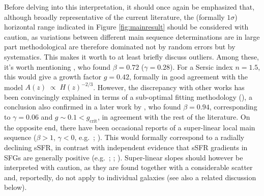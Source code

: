 \documentclass[fleqn,usenatbib]{mnras}
\begin{document}
Before delving into this interpretation, it should once again be emphasized that, although broadly representative of the current literature, the (formally $1 \sigma$) horizontal range indicated in Figure \ref{fig:mainresult} should be considered with caution, as variations between different main sequence determinations are in large part methodological are therefore dominated not by random errors but by systematics. This makes it worth to at least briefly discuss outliers. Among these, it's worth mentioning \cite{Cano-Diaz+16}, who found $\beta = 0.72$ ($\gamma = 0.28$). For a Sersic index $n=1.5$, this would give a growth factor $g=0.42$, formally in good agreement with the model $A(z) \; \propto \; H(z)^{-2/3}$. However, the discrepancy with other works has been convincingly explained in terms of a sub-optimal fitting methodology (\citealt{Hsieh+17}), a conclusion also confirmed in a later work by \cite{Cano-Diaz+19}, who found $\beta = 0.94$, corresponding to $\gamma = 0.06$ and  $g \sim 0.1 < g_\textrm{crit}$, in agreement with the rest of the literature. On the opposite end, there have been occasional reports of a super-linear local main sequence ($\beta > 1$, $\gamma < 0$, e.g.\ \citealt{Vulcani+19}; \citealt{Ellison+21}). This would formally correspond to a radially declining sSFR, in contrast with independent evidence that sSFR gradients in SFGs are generally positive (e.g.\ \citealt{MM07}; \citealt{Gonzalez-Delgado+16}; \citealt{Wang+19}). Super-linear slopes should however be interpreted with caution, as they are found together with a considerable scatter and, reportedly, do not apply to individual galaxies (see also a related discussion below).
\end{document}
